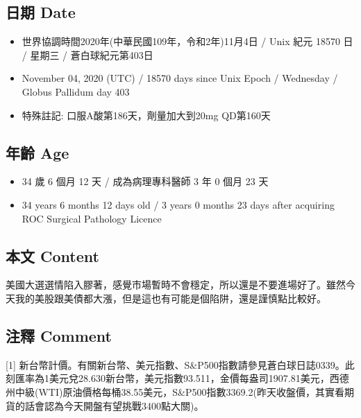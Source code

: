 \documentclass[
]{article}
\providecommand{\tightlist}{%
  \setlength{\itemsep}{0pt}\setlength{\parskip}{0pt}}
\begin{document}
\hypertarget{ux65e5ux671f-date-3}{%
\subsection{日期 Date}\label{ux65e5ux671f-date-3}}

\begin{itemize}
\tightlist
\item
  世界協調時間2020年(中華民國109年，令和2年)11月4日 / Unix 紀元 18570 日
  / 星期三 / 蒼白球紀元第403日
\item
  November 04, 2020 (UTC) / 18570 days since Unix Epoch / Wednesday /
  Globus Pallidum day 403
\item
  特殊註記: 口服A酸第186天，劑量加大到20mg QD第160天
\end{itemize}

\hypertarget{ux5e74ux9f61-age-3}{%
\subsection{年齡 Age}\label{ux5e74ux9f61-age-3}}

\begin{itemize}
\tightlist
\item
  34 歲 6 個月 12 天 / 成為病理專科醫師 3 年 0 個月 23 天
\item
  34 years 6 months 12 days old / 3 years 0 months 23 days after
  acquiring ROC Surgical Pathology Licence
\end{itemize}

\hypertarget{ux672cux6587-content-3}{%
\subsection{本文 Content}\label{ux672cux6587-content-3}}

美國大選選情陷入膠著，感覺市場暫時不會穩定，所以還是不要進場好了。雖然今天我的美股跟美債都大漲，但是這也有可能是個陷阱，還是謹慎點比較好。

\hypertarget{ux6ce8ux91cb-comment-3}{%
\subsection{注釋 Comment}\label{ux6ce8ux91cb-comment-3}}

{[}1{]}
新台幣計價。有關新台幣、美元指數、S\&P500指數請參見蒼白球日誌0339。此刻匯率為1美元兌28.630新台幣，美元指數93.511，金價每盎司1907.81美元，西德州中級(WTI)原油價格每桶38.55美元，S\&P500指數3369.2(昨天收盤價，其實看期貨的話會認為今天開盤有望挑戰3400點大關)。
\end{document}
